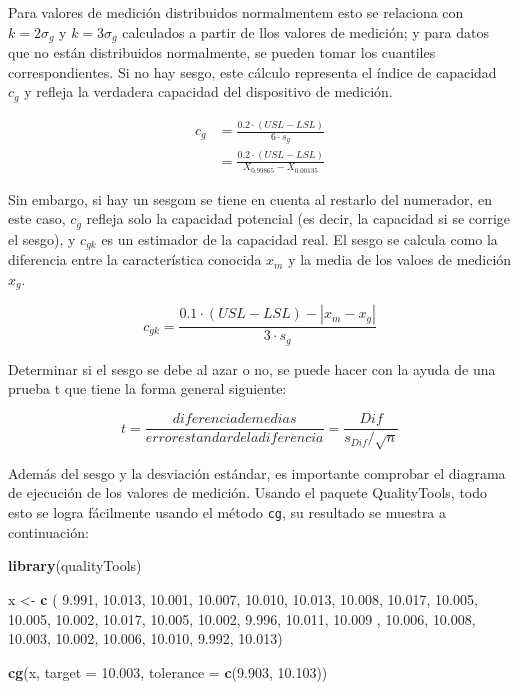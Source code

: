 \documentclass[
]{book}
\newenvironment{Shaded}{\begin{snugshade}}{\end{snugshade}}
\newcommand{\AttributeTok}[1]{\textcolor[rgb]{0.13,0.29,0.53}{#1}}
\newcommand{\FloatTok}[1]{\textcolor[rgb]{0.00,0.00,0.81}{#1}}
\newcommand{\FunctionTok}[1]{\textcolor[rgb]{0.13,0.29,0.53}{\textbf{#1}}}
\newcommand{\NormalTok}[1]{#1}
\newcommand{\OtherTok}[1]{\textcolor[rgb]{0.56,0.35,0.01}{#1}}
\begin{document}
Para valores de medición distribuidos normalmentem esto se relaciona con \(k = 2 \sigma_g\) y \(k = 3 \sigma_g\) calculados a partir de llos valores de medición; y para datos que no están distribuidos normalmente, se pueden tomar los cuantiles correspondientes. Si no hay sesgo, este cálculo representa el índice de capacidad \(c_g\) y refleja la verdadera capacidad del dispositivo de medición.

\[
\begin{aligned}
c_g &= \frac{0.2 \cdot (USL - LSL)}{6 \cdot s_g} \\
    &= \frac{0.2 \cdot (USL - LSL)}{X_{0.99865} - X_{0.00135}}  
\end{aligned}
\]

Sin embargo, si hay un sesgom se tiene en cuenta al restarlo del numerador, en este caso, \(c_g\) refleja solo la capacidad potencial (es decir, la capacidad si se corrige el sesgo), y \(c_{gk}\) es un estimador de la capacidad real. El sesgo se calcula como la diferencia entre la característica conocida \(x_m\) y la media de los valoes de medición \(x_g\).

\[
c_{gk} = \frac{0.1 \cdot (USL - LSL) - |x_m - x_g|}{3 \cdot s_g}
\]

Determinar si el sesgo se debe al azar o no, se puede hacer con la ayuda de una prueba t que tiene la forma general siguiente:

\[
t = \frac{diferencia de medias}{error estandar de la diferencia} = \frac{Dif}{s_{Dif}/\sqrt{n}}
\]

Además del sesgo y la desviación estándar, es importante comprobar el diagrama de ejecución de los valores de medición. Usando el paquete QualityTools, todo esto se logra fácilmente usando el método \texttt{cg}, su resultado se muestra a continuación:

\begin{Shaded}
\begin{Highlighting}[]
\FunctionTok{library}\NormalTok{(qualityTools)}

\NormalTok{x }\OtherTok{\textless{}{-}} \FunctionTok{c}\NormalTok{ ( }\FloatTok{9.991}\NormalTok{, }\FloatTok{10.013}\NormalTok{, }\FloatTok{10.001}\NormalTok{, }\FloatTok{10.007}\NormalTok{, }\FloatTok{10.010}\NormalTok{, }\FloatTok{10.013}\NormalTok{, }\FloatTok{10.008}\NormalTok{, }\FloatTok{10.017}\NormalTok{, }\FloatTok{10.005}\NormalTok{, }\FloatTok{10.005}\NormalTok{, }\FloatTok{10.002}\NormalTok{,}
        \FloatTok{10.017}\NormalTok{, }\FloatTok{10.005}\NormalTok{, }\FloatTok{10.002}\NormalTok{, }\FloatTok{9.996}\NormalTok{, }\FloatTok{10.011}\NormalTok{, }\FloatTok{10.009}\NormalTok{ , }\FloatTok{10.006}\NormalTok{, }\FloatTok{10.008}\NormalTok{, }\FloatTok{10.003}\NormalTok{, }\FloatTok{10.002}\NormalTok{, }\FloatTok{10.006}\NormalTok{, }
        \FloatTok{10.010}\NormalTok{, }\FloatTok{9.992}\NormalTok{, }\FloatTok{10.013}\NormalTok{)}

\FunctionTok{cg}\NormalTok{(x, }\AttributeTok{target =} \FloatTok{10.003}\NormalTok{, }\AttributeTok{tolerance =} \FunctionTok{c}\NormalTok{(}\FloatTok{9.903}\NormalTok{, }\FloatTok{10.103}\NormalTok{))}
\end{Highlighting}
\end{Shaded}
\end{document}
